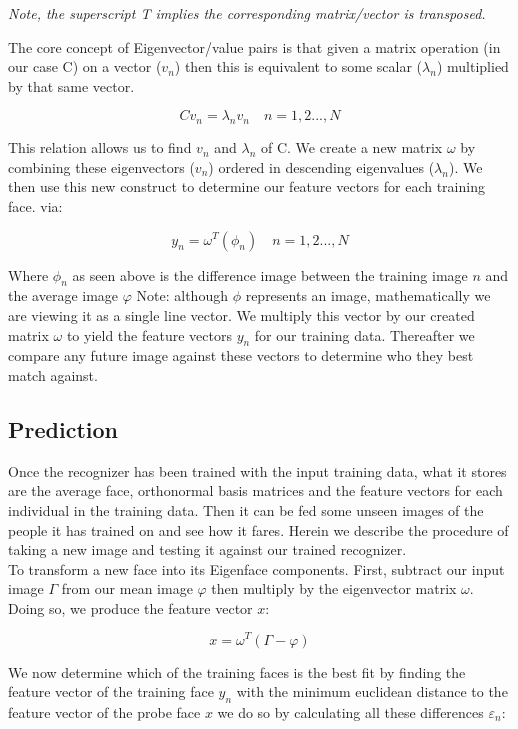 			\emph{Note, the superscript T implies the corresponding matrix/vector is transposed.}			
			
			The core concept of Eigenvector/value pairs is that given a matrix operation (in our case C) 
			on a vector ($v_{n}$) then this is equivalent to some scalar ($\lambda_{n}$) multiplied by that same vector. 
			
			\[		C v_{n} = \lambda_{n} v_{n} \quad n = 1,2...,N 		\]
			
			This relation allows us to find $v_{n}$ and $\lambda_{n}$ of C.  We create a new matrix $\omega$ by 
			combining these eigenvectors ($v_{n}$) ordered in descending eigenvalues ($\lambda_{n}$).  
			We then use this new construct to determine our feature vectors for each training face. via:			
			
			\[		y_n = \omega^T(\phi_n) 	\quad 	n = 1,2...,N 		\]
			
			Where $\phi_{n}$ as seen above is the difference image between the training image $n$ and the average image $\varphi$
			Note: although $\phi$ represents an image, mathematically we are viewing it as a single line vector.  We multiply this 
			vector by our created matrix $\omega$ to yield the feature vectors $y_n$ for our training data.  Thereafter we compare 
			any future image against these vectors to determine who they best match against.
			
		
			\subsection{Prediction}
			Once the recognizer has been trained with the input training data, what it stores are the average face, orthonormal basis 
			matrices and the feature vectors for each individual in the training data.  Then it can be fed some unseen images of the
			people it has trained on and see how it fares.  Herein we describe the procedure of taking a new image and testing it against 
			our trained recognizer. \\  
			
			To transform a new face into its Eigenface components.  First, subtract our input image $\Gamma$ from our mean image 
			$\varphi$ then multiply by the eigenvector matrix $\omega$.  Doing so, we produce the feature vector $x$:		
			
			\[		x = \omega^T(\Gamma - \varphi) \]
			
			We now determine which of the training faces is the best fit by finding the feature vector of the training face $y_n$ with the 
			minimum euclidean distance to the feature vector of the probe face $x$ we do so by calculating all these differences $\varepsilon_n$:
			

